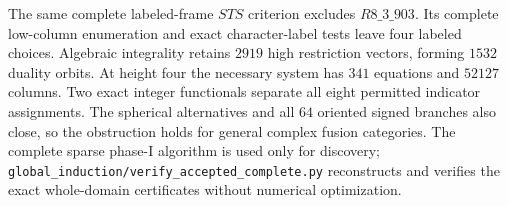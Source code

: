 The same complete labeled-frame $STS$ criterion excludes $R8\_3\_903$.
Its complete low-column enumeration and exact character-label tests leave
four labeled choices. Algebraic integrality retains $2919$ high restriction
vectors, forming $1532$ duality orbits. At height four the necessary system
has $341$ equations and $52127$ columns. Two exact integer functionals
separate all eight permitted indicator assignments. The spherical
alternatives and all $64$ oriented signed branches also close, so the
obstruction holds for general complex fusion categories.
The complete sparse phase-I algorithm is used only for discovery;
\texttt{global\_induction/verify\_accepted\_complete.py}
reconstructs and verifies the exact whole-domain certificates without
numerical optimization.
